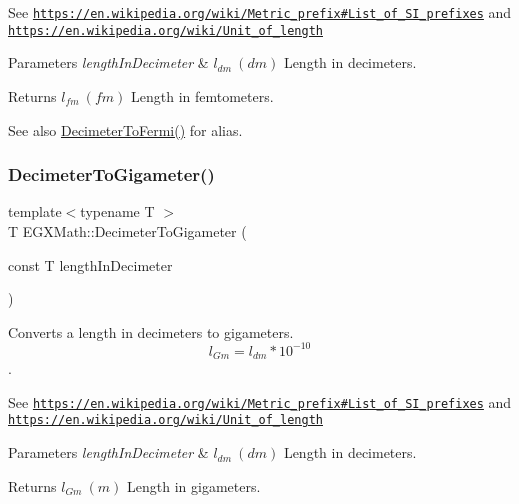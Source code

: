 See \href{https://en.wikipedia.org/wiki/Metric_prefix#List_of_SI_prefixes}{\tt https\+://en.\+wikipedia.\+org/wiki/\+Metric\+\_\+prefix\#\+List\+\_\+of\+\_\+\+S\+I\+\_\+prefixes} and \href{https://en.wikipedia.org/wiki/Unit_of_length}{\tt https\+://en.\+wikipedia.\+org/wiki/\+Unit\+\_\+of\+\_\+length} 
\begin{DoxyParams}{Parameters}
{\em length\+In\+Decimeter} & $ l_{dm}\ (dm)$ Length in decimeters. \\
\hline
\end{DoxyParams}
\begin{DoxyReturn}{Returns}
$ l_{fm}\ (fm)$ Length in femtometers. 
\end{DoxyReturn}
\begin{DoxySeeAlso}{See also}
\mbox{\hyperlink{group___e_g_x_math-_conversions-_length_conversions-_decimeter-_non-_s_i_ga2163b07afe9c89c1a1150516f615ef2a}{Decimeter\+To\+Fermi()}} for alias. 
\end{DoxySeeAlso}
\mbox{\label{group___e_g_x_math-_conversions-_length_conversions-_decimeter-_s_i_gab3fcc85ff18a685480d182d95da4d60b}} 
\subsubsection{\texorpdfstring{Decimeter\+To\+Gigameter()}{DecimeterToGigameter()}}
{\footnotesize\ttfamily template$<$typename T $>$ \\
T E\+G\+X\+Math\+::\+Decimeter\+To\+Gigameter (\begin{DoxyParamCaption}\item[{const T}]{length\+In\+Decimeter }\end{DoxyParamCaption})}



Converts a length in decimeters to gigameters. \[ l_{Gm}=l_{dm} * 10^{-10} \]. 

See \href{https://en.wikipedia.org/wiki/Metric_prefix#List_of_SI_prefixes}{\tt https\+://en.\+wikipedia.\+org/wiki/\+Metric\+\_\+prefix\#\+List\+\_\+of\+\_\+\+S\+I\+\_\+prefixes} and \href{https://en.wikipedia.org/wiki/Unit_of_length}{\tt https\+://en.\+wikipedia.\+org/wiki/\+Unit\+\_\+of\+\_\+length} 
\begin{DoxyParams}{Parameters}
{\em length\+In\+Decimeter} & $ l_{dm}\ (dm)$ Length in decimeters. \\
\hline
\end{DoxyParams}
\begin{DoxyReturn}{Returns}
$ l_{Gm}\ (m)$ Length in gigameters. 
\end{DoxyReturn}
\mbox{\label{group___e_g_x_math-_conversions-_length_conversions-_decimeter-_s_i_gaa84a9ad8f41f664e41c4c390186dfa1b}} 
